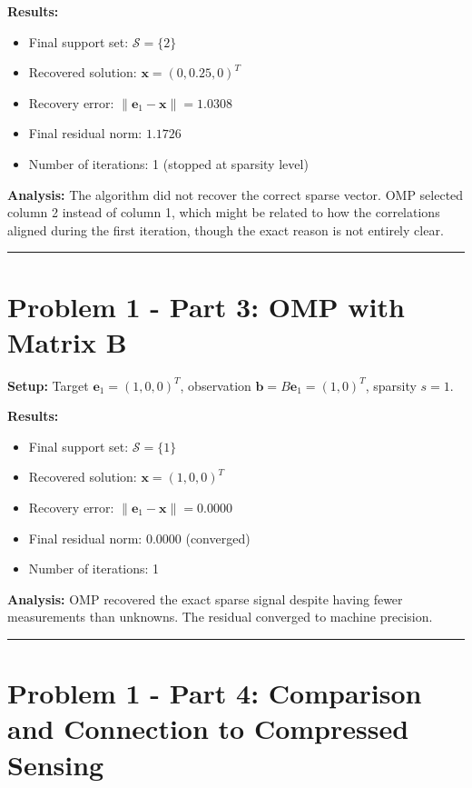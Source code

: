 \textbf{Results:}
\begin{itemize}
    \item Final support set: $\mathcal{S} = \{2\}$
    \item Recovered solution: $\mathbf{x} = (0, 0.25, 0)^T$
    \item Recovery error: $\|\mathbf{e}_1 - \mathbf{x}\| = 1.0308$
    \item Final residual norm: $1.1726$
    \item Number of iterations: 1 (stopped at sparsity level)
\end{itemize}

\textbf{Analysis:} The algorithm did not recover the correct sparse vector. OMP selected column 2 instead of column 1, which might be related to how the correlations aligned during the first iteration, though the exact reason is not entirely clear.

\vspace{2em}
\noindent\rule{\textwidth}{0.4pt}

\clearpage
\section*{Problem 1 - Part 3: OMP with Matrix B}

\textbf{Setup:} Target $\mathbf{e}_1 = (1, 0, 0)^T$, observation $\mathbf{b} = B\mathbf{e}_1 = (1, 0)^T$, sparsity $s=1$.

\textbf{Results:}
\begin{itemize}
    \item Final support set: $\mathcal{S} = \{1\}$
    \item Recovered solution: $\mathbf{x} = (1, 0, 0)^T$
    \item Recovery error: $\|\mathbf{e}_1 - \mathbf{x}\| = 0.0000$
    \item Final residual norm: $0.0000$ (converged)
    \item Number of iterations: 1
\end{itemize}

\textbf{Analysis:} OMP recovered the exact sparse signal despite having fewer measurements than unknowns. The residual converged to machine precision.

\vspace{2em}
\noindent\rule{\textwidth}{0.4pt}

\clearpage
\section*{Problem 1 - Part 4: Comparison and Connection to Compressed Sensing}


